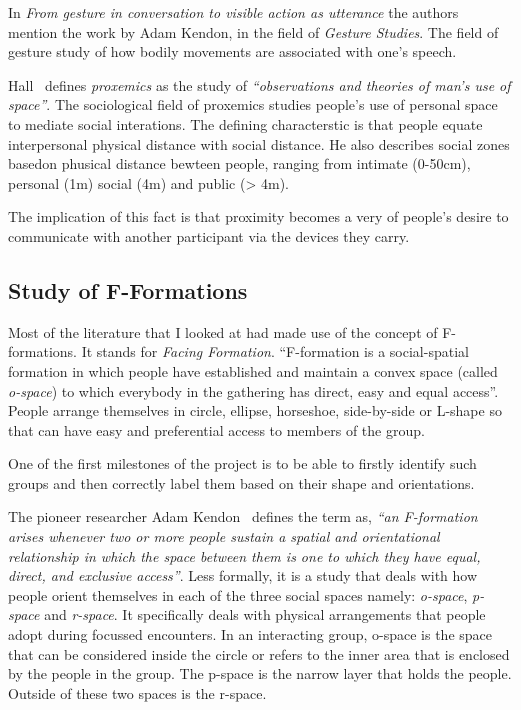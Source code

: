 In \emph{From gesture in conversation to visible action as
  utterance}\cite{bec44a41-d3b1-44f3-848a-aab268493c14} the authors
mention the work by Adam Kendon, in the field of \emph{Gesture
  Studies}. The field of gesture study of how bodily movements are
associated with one's speech.

Hall~\cite{Hall-1990} defines \emph{proxemics} as the study of
\emph{``observations and theories of man's use of space''}. The
sociological field of proxemics studies people's use of personal space
to mediate social interations. The defining characterstic is that
people equate interpersonal physical distance with social distance. He
also describes social zones basedon phusical distance bewteen people,
ranging from intimate (0-50cm), personal (1m) social (4m) and public
(> 4m).

The implication of this fact is that proximity becomes a very of
people's desire to communicate with another participant via the
devices they carry.


\subsection{Study of F-Formations}
Most of the literature that I looked at had made use of the concept of
F-formations. It stands for \emph{Facing Formation}.  ``F-formation is
a social-spatial formation in which people have established and
maintain a convex space (called \emph{o-space}) to which everybody in
the gathering has direct, easy and equal access''. People arrange
themselves in circle, ellipse, horseshoe, side-by-side or L-shape so
that can have easy and preferential access to members of the group.

One of the first milestones of the project is to be able to firstly
identify such groups and then correctly label them based on their
shape and orientations.

The pioneer researcher Adam Kendon~\cite{Kendon:formation:1990}
defines the term as, \emph{``an F-formation arises whenever two or
  more people sustain a spatial and orientational relationship in
  which the space between them is one to which they have equal,
  direct, and exclusive access''}. Less formally, it is a study that
deals with how people orient themselves in each of the three social
spaces namely: \emph{o-space}, \emph{p-space} and \emph{r-space}. It
specifically deals with physical arrangements that people adopt during
focussed encounters. In an interacting group, o-space is the space
that can be considered inside the circle or refers to the inner area
that is enclosed by the people in the group. The p-space is the narrow
layer that holds the people. Outside of these two spaces is the
r-space.

